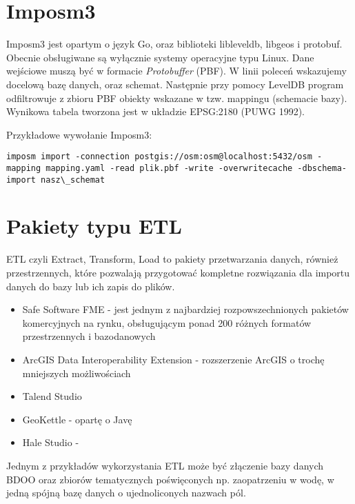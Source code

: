 	
	\section{Imposm3}
	
Imposm3 jest opartym o język Go, oraz biblioteki libleveldb, libgeos i protobuf. Obecnie obsługiwane są wyłącznie systemy operacyjne typu Linux. Dane wejściowe muszą być w formacie \textit{Protobuffer} (PBF). W linii poleceń wskazujemy docelową bazę danych, oraz schemat. Następnie przy pomocy LevelDB program odfiltrowuje z zbioru PBF obiekty wskazane w tzw. mappingu (schemacie bazy). Wynikowa tabela tworzona jest w układzie EPSG:2180 (PUWG 1992).

Przykładowe wywołanie Imposm3:
\begin{lstlisting}
imposm import -connection postgis://osm:osm@localhost:5432/osm -mapping mapping.yaml -read plik.pbf -write -overwritecache -dbschema-import nasz\_schemat  
\end{lstlisting}
	
	\section{Pakiety typu ETL}
	
	ETL czyli Extract, Transform, Load to pakiety przetwarzania danych, również przestrzennych, które pozwalają przygotować kompletne rozwiązania dla importu danych do bazy lub ich zapis do plików. 
	
	\begin{itemize}
		\item Safe Software FME - jest jednym z najbardziej rozpowszechnionych pakietów komercyjnych na rynku, obsługującym ponad 200 różnych formatów przestrzennych i bazodanowych
		\item ArcGIS Data Interoperability Extension - rozszerzenie ArcGIS o trochę mniejszych możliwościach
		\item Talend Studio
		\item GeoKettle - opartę o Javę
		\item Hale Studio - 
	\end{itemize}
	
	Jednym z przykładów wykorzystania ETL może być złączenie bazy danych BDOO oraz zbiorów tematycznych poświęconych np. zaopatrzeniu w wodę, w jedną spójną bazę danych o ujednoliconych nazwach pól.
	
	
